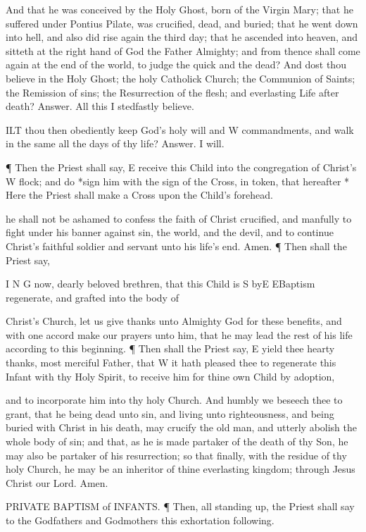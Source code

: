 And that he was conceived by the Holy Ghost, born of the Virgin Mary; that he suffered under Pontius Pilate, was crucified, dead, and buried; that he went down into hell, and also did rise again the third day; that he ascended into heaven, and sitteth at the right hand of God the Father Almighty; and from thence shall come again at the end of the world, to judge the quick and the dead? And dost thou believe in the Holy Ghost; the holy Catholick Church; the Communion of Saints; the Remission of sins; the Resurrection of the flesh; and everlasting Life after death? Answer. All this I stedfastly believe.

ILT thou then obediently keep God’s holy will and W commandments, and walk in the same all the days of thy life? Answer. I will.

¶ Then the Priest shall say, E receive this Child into the congregation of Christ’s W flock; and do *sign him with the sign of the Cross, in token, that hereafter * Here the Priest shall make a Cross upon the Child's forehead.

he shall not be ashamed to confess the faith of Christ crucified, and manfully to fight under his banner against sin, the world, and the devil, and to continue Christ’s faithful soldier and servant unto his life’s end. Amen. ¶ Then shall the Priest say,

I N G now, dearly beloved brethren, that this Child is S byE EBaptism regenerate, and grafted into the body of

Christ’s Church, let us give thanks unto Almighty God for these benefits, and with one accord make our prayers unto him, that he may lead the rest of his life according to this beginning. ¶ Then shall the Priest say, E yield thee hearty thanks, most merciful Father, that W it hath pleased thee to regenerate this Infant with thy Holy Spirit, to receive him for thine own Child by adoption,

and to incorporate him into thy holy Church. And humbly we beseech thee to grant, that he being dead unto sin, and living unto righteousness, and being buried with Christ in his death, may crucify the old man, and utterly abolish the whole body of sin; and that, as he is made partaker of the death of thy Son, he may also be partaker of his resurrection; so that finally, with the residue of thy holy Church, he may be an inheritor of thine everlasting kingdom; through Jesus Christ our Lord. Amen.

PRIVATE BAPTISM of INFANTS. ¶ Then, all standing up, the Priest shall say to the Godfathers and Godmothers this exhortation following.


